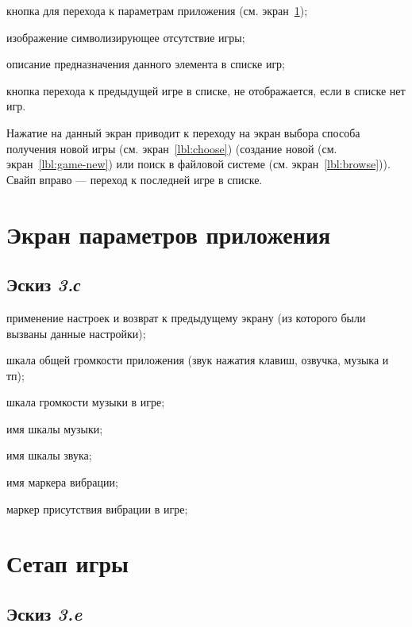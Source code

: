 \begin{enumerate*}
    \item кнопка для перехода к параметрам приложения (см. экран~\ref{lbl:app-settings});
    \item изображение символизирующее отсутствие игры;
    \item описание предназначения данного элемента в списке игр;
    \item кнопка перехода к предыдущей игре в списке, не отображается, если в списке нет игр.
\end{enumerate*}
Нажатие на данный экран приводит к переходу на экран выбора способа получения новой игры (см. экран~\ref{lbl:choose}) (создание новой (см. экран~\ref{lbl:game-new}) или поиск в файловой системе (см. экран~\ref{lbl:browse})). Свайп вправо --- переход к последней игре в списке.

\section{Экран параметров приложения}\label{lbl:app-settings}

\subsection{Эскиз \emph{3.с}}

\begin{enumerate*}
    \item применение настроек и возврат к предыдущему экрану (из которого были вызваны данные настройки);
    \item шкала общей громкости приложения (звук нажатия клавиш, озвучка, музыка и тп);
    \item шкала громкости музыки в игре;
    \item имя шкалы музыки;
    \item имя шкалы звука;
    \item имя маркера вибрации;
    \item маркер присутствия вибрации в игре;
\end{enumerate*}

\section{Сетап игры}\label{lbl:game-setup}

\subsection{Эскиз \emph{3.e}}

